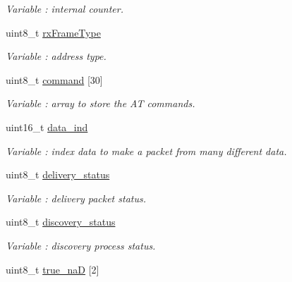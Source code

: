 \begin{DoxyCompactItemize}
\begin{DoxyCompactList}\small\item\em Variable \+: internal counter. \end{DoxyCompactList}\item 
uint8\+\_\+t \hyperlink{class_wasp_x_bee_core_afaf2c3a20d481aad0696152cd8a63ad2}{rx\+Frame\+Type}
\begin{DoxyCompactList}\small\item\em Variable \+: address type. \end{DoxyCompactList}\item 
uint8\+\_\+t \hyperlink{class_wasp_x_bee_core_abcc43fbb1c70fefe5f3ec134ba3e6f30}{command} \mbox{[}30\mbox{]}\hypertarget{class_wasp_x_bee_core_abcc43fbb1c70fefe5f3ec134ba3e6f30}{}\label{class_wasp_x_bee_core_abcc43fbb1c70fefe5f3ec134ba3e6f30}

\begin{DoxyCompactList}\small\item\em Variable \+: array to store the AT commands. \end{DoxyCompactList}\item 
uint16\+\_\+t \hyperlink{class_wasp_x_bee_core_af038fd4c9b17ccccca68e19ddcd5680f}{data\+\_\+ind}
\begin{DoxyCompactList}\small\item\em Variable \+: index data to make a packet from many different data. \end{DoxyCompactList}\item 
uint8\+\_\+t \hyperlink{class_wasp_x_bee_core_a0bb27fdc3f1cca0b8160b62ca500d554}{delivery\+\_\+status}\hypertarget{class_wasp_x_bee_core_a0bb27fdc3f1cca0b8160b62ca500d554}{}\label{class_wasp_x_bee_core_a0bb27fdc3f1cca0b8160b62ca500d554}

\begin{DoxyCompactList}\small\item\em Variable \+: delivery packet status. \end{DoxyCompactList}\item 
uint8\+\_\+t \hyperlink{class_wasp_x_bee_core_aa6776c5fd41e62daa05e24db04aeca58}{discovery\+\_\+status}\hypertarget{class_wasp_x_bee_core_aa6776c5fd41e62daa05e24db04aeca58}{}\label{class_wasp_x_bee_core_aa6776c5fd41e62daa05e24db04aeca58}

\begin{DoxyCompactList}\small\item\em Variable \+: discovery process status. \end{DoxyCompactList}\item 
uint8\+\_\+t \hyperlink{class_wasp_x_bee_core_a6aacb5dac4418063559f4384b887aaee}{true\+\_\+naD} \mbox{[}2\mbox{]}\hypertarget{class_wasp_x_bee_core_a6aacb5dac4418063559f4384b887aaee}{}\label{class_wasp_x_bee_core_a6aacb5dac4418063559f4384b887aaee}


\end{DoxyCompactItemize}
